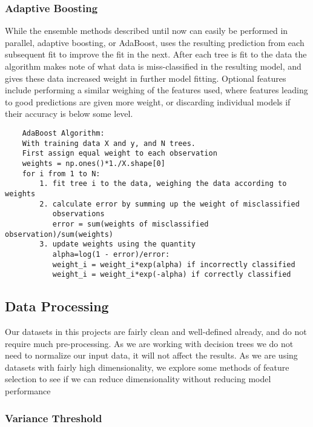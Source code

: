 \documentclass[11pt]{article}
\begin{document}
    \hypertarget{adaptive-boosting}{%
\subsubsection{Adaptive Boosting}\label{adaptive-boosting}}

While the ensemble methods described until now can easily be performed
in parallel, adaptive boosting, or AdaBoost, uses the resulting
prediction from each subsequent fit to improve the fit in the next.
After each tree is fit to the data the algorithm makes note of what data
is miss-classified in the resulting model, and gives these data increased
weight in further model fitting. Optional features include performing a
similar weighing of the features used, where features leading to good
predictions are given more weight, or discarding individual  models if their accuracy
is below some level.

\begin{BVerbatim}
	AdaBoost Algorithm:
	With training data X and y, and N trees.
	First assign equal weight to each observation
	weights = np.ones()*1./X.shape[0]
	for i from 1 to N:
	    1. fit tree i to the data, weighing the data according to weights
		2. calculate error by summing up the weight of misclassified
		   observations
	       error = sum(weights of misclassified observation)/sum(weights)
		3. update weights using the quantity
		   alpha=log(1 - error)/error: 
		   weight_i = weight_i*exp(alpha) if incorrectly classified 
		   weight_i = weight_i*exp(-alpha) if correctly classified 
\end{BVerbatim}

    \hypertarget{data-processing}{%
\subsection{Data Processing}\label{data-processing}}
Our datasets in this projects are fairly clean and well-defined already, and do not require much pre-processing. As we are working with decision trees we do not need to normalize our input data, it will not affect the results. As we are using datasets with fairly high dimensionality, we explore some methods of feature selection to see if we can reduce dimensionality without reducing model performance

\hypertarget{variance-threshold}{%
\subsubsection*{Variance Threshold}\label{variance-threshold}}
\end{document}
